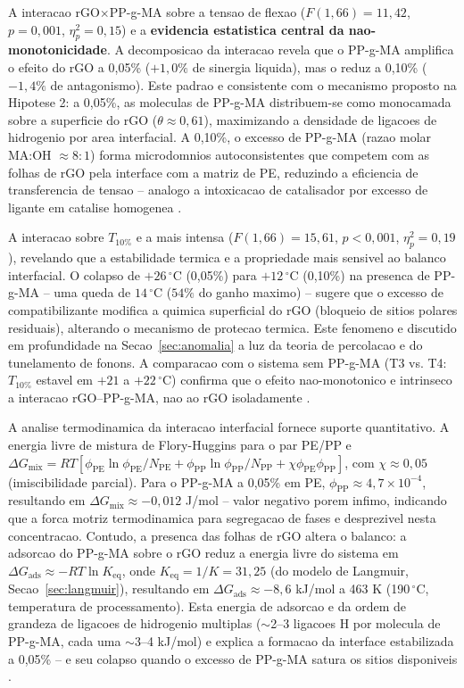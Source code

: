 \documentclass[11pt,a4paper,oneside]{article}
\begin{document}
A interacao rGO$\times$PP-g-MA sobre a tensao de flexao ($F(1{,}66){=}11{,}42$, $p{=}0{,}001$, $\eta^2_p{=}0{,}15$) e a {\bfseries evidencia estatistica central da nao-monotonicidade}. A decomposicao da interacao revela que o PP-g-MA amplifica o efeito do rGO a 0,05\% ($+1{,}0\%$ de sinergia liquida), mas o reduz a 0,10\% ($-1{,}4\%$ de antagonismo). Este padrao e consistente com o mecanismo proposto na Hipotese 2: a 0,05\%, as moleculas de PP-g-MA distribuem-se como monocamada sobre a superficie do rGO ($\theta{\approx}0{,}61$), maximizando a densidade de ligacoes de hidrogenio por area interfacial. A 0,10\%, o excesso de PP-g-MA (razao molar MA:OH ${\approx}8{:}1$) forma microdomnios autoconsistentes que competem com as folhas de rGO pela interface com a matriz de PE, reduzindo a eficiencia de transferencia de tensao -- analogo a intoxicacao de catalisador por excesso de ligante em catalise homogenea \cite{Natarajan2020, Sanchez2018}.

A interacao sobre $T_{10\%}$ e a mais intensa ($F(1{,}66){=}15{,}61$, $p{<}0{,}001$, $\eta^2_p{=}0{,}19$), revelando que a estabilidade termica e a propriedade mais sensivel ao balanco interfacial. O colapso de $+26\,^{\circ}$C (0,05\%) para $+12\,^{\circ}$C (0,10\%) na presenca de PP-g-MA -- uma queda de $14\,^{\circ}$C ($54\%$ do ganho maximo) -- sugere que o excesso de compatibilizante modifica a quimica superficial do rGO (bloqueio de sitios polares residuais), alterando o mecanismo de protecao termica. Este fenomeno e discutido em profundidade na Secao~\ref{sec:anomalia} a luz da teoria de percolacao e do tunelamento de fonons. A comparacao com o sistema sem PP-g-MA (T3 vs. T4: $T_{10\%}$ estavel em $+21$ a $+22\,^{\circ}$C) confirma que o efeito nao-monotonico e intrinseco a interacao rGO--PP-g-MA, nao ao rGO isoladamente \cite{Celzard1996, Kim2010}.

A analise termodinamica da interacao interfacial fornece suporte quantitativo. A energia livre de mistura de Flory-Huggins para o par PE/PP e $\Delta G_{\text{mix}}{=}RT[\phi_{\text{PE}}\ln\phi_{\text{PE}}/N_{\text{PE}}{+}\phi_{\text{PP}}\ln\phi_{\text{PP}}/N_{\text{PP}}{+}\chi\phi_{\text{PE}}\phi_{\text{PP}}]$, com $\chi{\approx}0{,}05$ (imiscibilidade parcial). Para o PP-g-MA a 0,05\% em PE, $\phi_{\text{PP}}{\approx}4{,}7{\times}10^{-4}$, resultando em $\Delta G_{\text{mix}}{\approx}{-}0{,}012$ J/mol -- valor negativo porem infimo, indicando que a forca motriz termodinamica para segregacao de fases e desprezivel nesta concentracao. Contudo, a presenca das folhas de rGO altera o balanco: a adsorcao do PP-g-MA sobre o rGO reduz a energia livre do sistema em $\Delta G_{\text{ads}}{\approx}{-}RT\ln K_{\text{eq}}$, onde $K_{\text{eq}}{=}1/K{=}31{,}25$ (do modelo de Langmuir, Secao~\ref{sec:langmuir}), resultando em $\Delta G_{\text{ads}}{\approx}{-}8{,}6$ kJ/mol a 463 K (190$\,^{\circ}$C, temperatura de processamento). Esta energia de adsorcao e da ordem de grandeza de ligacoes de hidrogenio multiplas (${\sim}$2--3 ligacoes H por molecula de PP-g-MA, cada uma ${\sim}$3--4 kJ/mol) e explica a formacao da interface estabilizada a 0,05\% -- e seu colapso quando o excesso de PP-g-MA satura os sitios disponiveis \cite{Lopez2021}.
\end{document}
